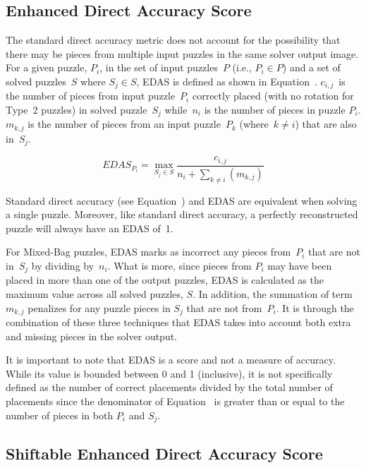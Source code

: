 \subsection{Enhanced Direct Accuracy Score}\label{sec:enhancedDirectAccuracyScore}

The standard direct accuracy metric does not account for the possibility that there may be pieces from multiple input puzzles in the same solver output image.  For a given puzzle, $P_i$, in the set of input puzzles~$P$ (i.e., $P_i \in P$) and a set of solved puzzles~$S$ where $S_j \in S$, EDAS is defined as shown in Equation~.  $c_{i,j}$~is the number of pieces from input puzzle~$P_i$ correctly placed (with no rotation for Type~2 puzzles) in solved puzzle~$S_j$ while~$n_i$ is the number of pieces in puzzle $P_i$. $m_{k,j}$ is the number of pieces from an input puzzle~$P_k$ (where~$k \ne i$) that are also in~$S_j$.

\begin{equation} \label{eq:enhancedDirectAccuracyScore}
  EDAS_{P_i} = \max\limits_{S_j \in S}\frac{c_{i,j}}{n_i + \sum_{k \ne i}(m_{k,j})}
\end{equation}

Standard direct accuracy (see Equation~) and EDAS are equivalent when solving a single puzzle. Moreover, like standard direct accuracy, a perfectly reconstructed puzzle will always have an EDAS of~1. 

For Mixed-Bag puzzles, EDAS marks as incorrect any pieces from~$P_i$ that are not in~$S_j$ by dividing by~$n_i$.  What is more, since pieces from $P_i$ may have been placed in more than one of the output puzzles, EDAS is calculated as the maximum value across all solved puzzles, $S$.  In addition, the summation of term~$m_{k,j}$ penalizes for any puzzle pieces in $S_j$ that are not from~$P_i$.  It is through the combination of these three techniques that EDAS takes into account both extra and missing pieces in the solver output.

It is important to note that EDAS is a score and not a measure of accuracy. While its value is bounded between 0 and 1 (inclusive), it is not specifically defined as the number of correct placements divided by the total number of placements since the denominator of Equation~ is greater than or equal to the number of pieces in both $P_i$ and $S_j$.

\subsection{Shiftable Enhanced Direct Accuracy Score}\label{sec:shiftableEnhancedDirectAccuracy}

